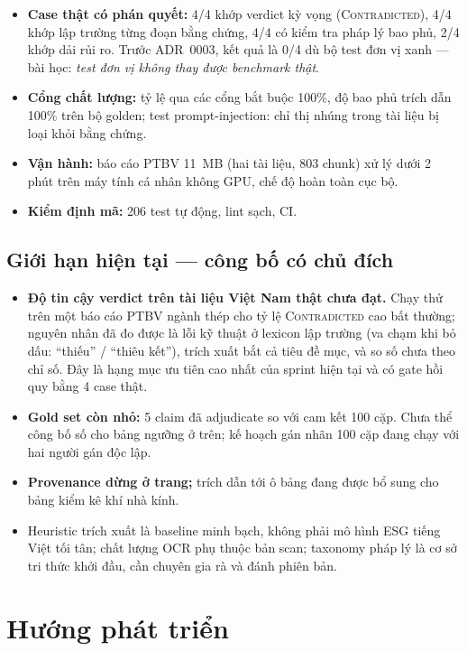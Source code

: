 \documentclass[11pt,a4paper]{article}
\newcommand{\status}[1]{\textsc{#1}}
\begin{document}
\begin{itemize}
  \item \textbf{Case thật có phán quyết:} 4/4 khớp verdict kỳ vọng (\status{Contradicted}), 4/4 khớp lập trường từng đoạn bằng chứng, 4/4 có kiểm tra pháp lý bao phủ, 2/4 khớp dải rủi ro. Trước ADR~0003, kết quả là 0/4 dù bộ test đơn vị xanh — bài học: \emph{test đơn vị không thay được benchmark thật}.
  \item \textbf{Cổng chất lượng:} tỷ lệ qua các cổng bắt buộc 100\%, độ bao phủ trích dẫn 100\% trên bộ golden; test prompt-injection: chỉ thị nhúng trong tài liệu bị loại khỏi bằng chứng.
  \item \textbf{Vận hành:} báo cáo PTBV 11~MB (hai tài liệu, 803 chunk) xử lý dưới 2 phút trên máy tính cá nhân không GPU, chế độ hoàn toàn cục bộ.
  \item \textbf{Kiểm định mã:} 206 test tự động, lint sạch, CI.
\end{itemize}

\subsection{Giới hạn hiện tại — công bố có chủ đích}

\begin{itemize}
  \item \textbf{Độ tin cậy verdict trên tài liệu Việt Nam thật chưa đạt.} Chạy thử trên một báo cáo PTBV ngành thép cho tỷ lệ \status{Contradicted} cao bất thường; nguyên nhân đã đo được là lỗi kỹ thuật ở lexicon lập trường (va chạm khi bỏ dấu: ``thiếu'' / ``thiêu kết''), trích xuất bắt cả tiêu đề mục, và so số chưa theo chỉ số. Đây là hạng mục ưu tiên cao nhất của sprint hiện tại và có gate hồi quy bằng 4 case thật.
  \item \textbf{Gold set còn nhỏ:} 5 claim đã adjudicate so với cam kết 100 cặp. Chưa thể công bố số cho bảng ngưỡng ở trên; kế hoạch gán nhãn 100 cặp đang chạy với hai người gán độc lập.
  \item \textbf{Provenance dừng ở trang;} trích dẫn tới ô bảng đang được bổ sung cho bảng kiểm kê khí nhà kính.
  \item Heuristic trích xuất là baseline minh bạch, không phải mô hình ESG tiếng Việt tối tân; chất lượng OCR phụ thuộc bản scan; taxonomy pháp lý là cơ sở tri thức khởi đầu, cần chuyên gia rà và đánh phiên bản.
\end{itemize}

\section{Hướng phát triển}
\end{document}
